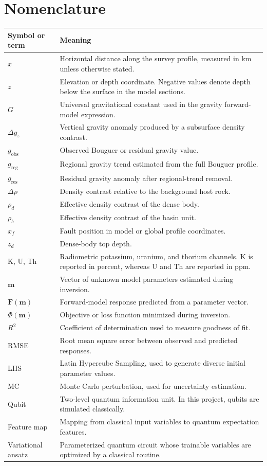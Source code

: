 \documentclass[12pt,a4paper]{article}
\begin{document}
\section*{Nomenclature}
\begin{longtable}{p{}p{}}
\toprule
Symbol or term & Meaning \\
\midrule
\endhead
$x$ & Horizontal distance along the survey profile, measured in km unless otherwise stated. \\
$z$ & Elevation or depth coordinate. Negative values denote depth below the surface in the model sections. \\
$G$ & Universal gravitational constant used in the gravity forward-model expression. \\
$\Delta g_z$ & Vertical gravity anomaly produced by a subsurface density contrast. \\
$g_{\mathrm{obs}}$ & Observed Bouguer or residual gravity value. \\
$g_{\mathrm{reg}}$ & Regional gravity trend estimated from the full Bouguer profile. \\
$g_{\mathrm{res}}$ & Residual gravity anomaly after regional-trend removal. \\
$\Delta \rho$ & Density contrast relative to the background host rock. \\
$\rho_d$ & Effective density contrast of the dense body. \\
$\rho_b$ & Effective density contrast of the basin unit. \\
$x_f$ & Fault position in model or global profile coordinates. \\
$z_d$ & Dense-body top depth. \\
K, U, Th & Radiometric potassium, uranium, and thorium channels. K is reported in percent, whereas U and Th are reported in ppm. \\
$\mathbf{m}$ & Vector of unknown model parameters estimated during inversion. \\
$\mathbf{F}(\mathbf{m})$ & Forward-model response predicted from a parameter vector. \\
$\Phi(\mathbf{m})$ & Objective or loss function minimized during inversion. \\
$R^2$ & Coefficient of determination used to measure goodness of fit. \\
RMSE & Root mean square error between observed and predicted responses. \\
LHS & Latin Hypercube Sampling, used to generate diverse initial parameter values. \\
MC & Monte Carlo perturbation, used for uncertainty estimation. \\
Qubit & Two-level quantum information unit. In this project, qubits are simulated classically. \\
Feature map & Mapping from classical input variables to quantum expectation features. \\
Variational ansatz & Parameterized quantum circuit whose trainable variables are optimized by a classical routine. \\
\bottomrule
\end{longtable}
\end{document}
